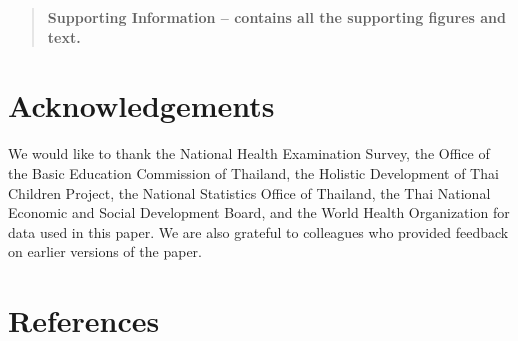 \documentclass[10pt,letterpaper]{article}
\begin{document}
\begin{quote}
\textbf{Supporting Information -- contains all the supporting figures and text.}
\end{quote}

\hypertarget{acknowledgements}{%
\section{Acknowledgements}\label{acknowledgements}}

We would like to thank the National Health Examination Survey, the
Office of the Basic Education Commission of Thailand, the Holistic
Development of Thai Children Project, the National Statistics Office of
Thailand, the Thai National Economic and Social Development Board, and
the World Health Organization for data used in this paper. We are also
grateful to colleagues who provided feedback on earlier versions of the
paper.

\hypertarget{references}{%
\section*{References}\label{references}}
\end{document}

